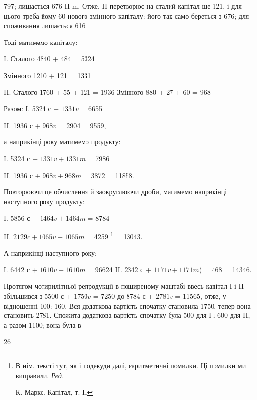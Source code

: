 \parcont{}  %
797; лишається 676 II m. Отже, II перетворює на сталий капітал
ще 121, і для цього треба йому 60 нового змінного капіталу: його
так само береться з 676; для споживання лишається 616.

Тоді матимемо капіталу:

I. Сталого 4840 + 484 = 5324

Змінного 1210 + 121 = 1331

II. Сталого 1760 + 55 + 121 = 1936
Змінного 880 + 27 + 60 = 968

Разом: І. 5324 с + $1331 v$ = 6655

II. 1936 с + $968 v$ = 2904
= 9559,

а наприкінці року матимемо продукту:

I.    5324 с + $1331 v + 1331 m$ = 7986

II.    1936 с + $968 v + 968 m$ = 3872
= 11858.

Повторюючи це обчислення й заокруглюючи дроби, матимемо наприкінці
наступного року продукту:

I.    5856 с + $1464 v + 1464 m$ = 8784

II.    $2129 c + 1065 v + 1065 m$ = 4259 \footnote*{
В нім. тексті тут, як і подекуди далі, єаритметичні помилки. Ці помилки ми
виправили. \emph{Ред.}

К. Маркс. Капітал, т. II
}
= 13043.

А наприкінці наступного року:

І. 6442 с + $1610 v + 1610 m$ = 96624
II. 2342 с + $1171 v + 1171 m$) = 468
= 14346.

Протягом чотирилітньої репродукції в поширеному маштабі ввесь
капітал І і II збільшився з 5500 с + $1750 v$ = 7250 до 8784 с + $2781 v$ =
11565, отже, у відношенні 100: 160. Вся додаткова вартість спочатку
становила 1750, тепер вона становить 2781. Спожита додаткова вартість
спочатку була 500 для І і 600 для II, а разом 1100; вона була в

26
\parbreak{}  %

